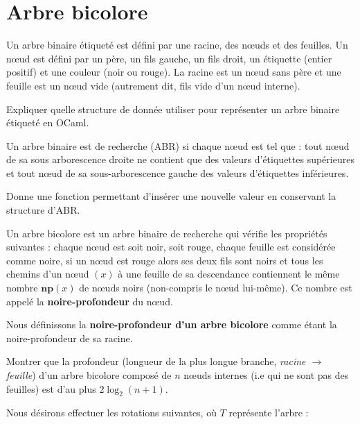 \renewcommand{\SourceFile}{4-arborescences/src/4-2.ml}

\section{Arbre bicolore}

\Q
Un arbre binaire étiqueté est défini par une racine, des nœuds et des feuilles. Un nœud est défini par un père, un fils gauche, un fils droit, un étiquette (entier positif) et une couleur (noir ou rouge). La racine est un nœud sans père et une feuille est un nœud vide (autrement dit, fils vide d'un nœud interne).
\medskip

Expliquer quelle structure de donnée utiliser pour représenter un arbre binaire étiqueté en OCaml.

\Q
Un arbre binaire est de recherche (ABR) si chaque nœud est tel que : tout nœud de sa sous arborescence droite ne contient que des valeurs d'étiquettes supérieures et tout nœud de sa sous-arborescence gauche des valeurs d'étiquettes inférieures.
\medskip

Donne une fonction permettant d'insérer une nouvelle valeur en conservant la structure d'ABR.

\Q
Un arbre bicolore est un arbre binaire de recherche qui vérifie les propriétés suivantes : chaque nœud est soit noir, soit rouge, chaque feuille est considérée comme noire, si un nœud est rouge alors ses deux fils sont noirs et tous les chemins d'un nœud $(x)$ à une feuille de sa descendance contiennent le même nombre $\textbf{np}(x)$ de nœuds noirs (non-compris le nœud lui-même). Ce nombre est appelé la \textbf{noire-profondeur} du nœud.
\medskip

Nous définissons la \textbf{noire-profondeur d'un arbre bicolore} comme étant la noire-profondeur de sa racine.
\medskip

Montrer que la profondeur (longueur de la plus longue branche, \textit{racine $\rightarrow$ feuille}) d'un arbre bicolore composé de $n$ nœuds internes (i.e qui ne sont pas des feuilles) est d'au plus $2\log_2(n+1)$.

\Q
Nous désirons effectuer les rotations suivantes, où $T$ représente l'arbre :
\bigskip

\bigskip

